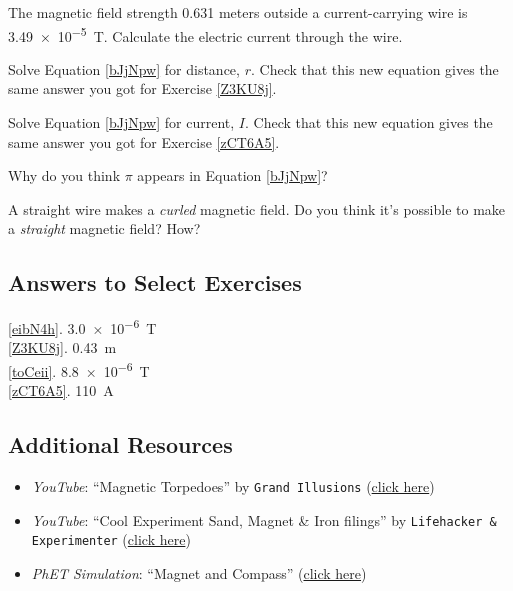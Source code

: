 \documentclass{article}
\numberwithin{equation}{section}
\numberwithin{figure}{section}
\begin{document}
\begin{exercise} \label{zCT6A5}
    The magnetic field strength 0.631 meters outside a current-carrying wire is \SI{3.49e-5}{T}. Calculate the electric current through the wire.
\end{exercise}

\begin{exercise}
    Solve Equation \ref{bJjNpw} for distance, $r$. Check that this new equation gives the same answer you got for Exercise \ref{Z3KU8j}. 
\end{exercise}

\begin{exercise}
    Solve Equation \ref{bJjNpw} for current, $I$. Check that this new equation gives the same answer you got for Exercise \ref{zCT6A5}. 
\end{exercise}

\begin{exercise}
    Why do you think $\pi$ appears in Equation \ref{bJjNpw}?
\end{exercise}

\begin{exercise}
A straight wire makes a \textit{curled} magnetic field. Do you think it's possible to make a \textit{straight} magnetic field? How?
\end{exercise}

\clearpage

\subsection*{Answers to Select Exercises}

\ref{eibN4h}. \SI{3.0e-6}{T}\\
\ref{Z3KU8j}. \SI{0.43}{m}\\
\ref{toCeii}. \SI{8.8e-6}{T}\\
\ref{zCT6A5}. \SI{110}{A}\\



\subsection*{Additional Resources}

\begin{itemize}
    \item \textit{YouTube}: ``Magnetic Torpedoes'' by \texttt{Grand Illusions} (\href{https://youtu.be/jbGaSL6wJ8M}{click here})
    \item \textit{YouTube}: ``Cool Experiment Sand, Magnet \& Iron filings'' by \texttt{Lifehacker \& Experimenter} (\href{https://youtu.be/tfiebTsJDno}{click here})
    \item \textit{PhET Simulation}: ``Magnet and Compass'' (\href{https://phet.colorado.edu/en/simulation/legacy/magnet-and-compass}{click here})
\end{itemize}




\clearpage
\printnoidxglossaries
\end{document}
